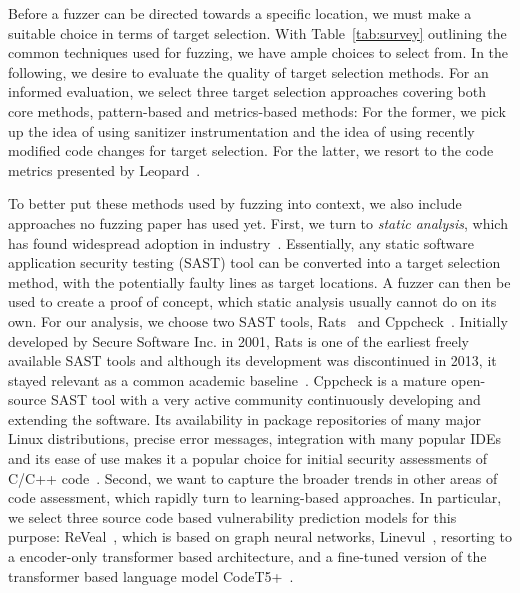 Before a fuzzer can be directed towards a specific location, we must make a suitable choice in terms of target selection. With Table~\ref{tab:survey} outlining the common techniques used for fuzzing, we have ample choices to select from. In the following, we desire to evaluate the quality of target selection methods. For an informed evaluation, we select three target selection approaches covering both core methods, pattern-based and metrics-based methods: For the former, we pick up the idea of using sanitizer instrumentation \cite{OstRazBosGiu+20, CheLiXuGuo+20, ZheZhaHuaRen+23} and the idea of using recently modified code changes \cite{ZhuBöh21} for target selection. For the latter, we resort to the code metrics presented by Leopard~\cite{DuCheLiGuo+19}.

To better put these methods used by fuzzing into context, we also include approaches no fuzzing paper has used yet.
First, we turn to \emph{static analysis}, which has found widespread adoption in industry~\cite{FacebookInfer, GoogleSAST, GithubSAST}.
Essentially, any static software application security testing (SAST) tool can be converted into a target selection method, with the potentially faulty lines as target locations. A fuzzer can then be used to create a proof of concept, which static analysis usually cannot do on its own. 
For our analysis, we choose two SAST tools, Rats~\cite{rats} and Cppcheck~\cite{cppcheck}. 
Initially developed by Secure Software Inc. in 2001, Rats is one of the earliest freely available SAST tools and although its development was discontinued in 2013, it stayed relevant as a  common academic baseline~\cite{SASTeval2018, KAUR20202023, 10.1145/3475716.3475781}.
Cppcheck is a mature open-source SAST tool with a very active community continuously developing and extending the software. 
Its availability in package repositories of many major Linux distributions, precise error messages, integration with many popular IDEs and its ease of use makes it a popular choice for initial security assessments of C/C++ code~\cite{cppcheck, 8531281}.
Second, we want to capture the broader trends in other areas of code assessment, which rapidly turn to learning-based approaches. In particular, we select three source code based vulnerability prediction models for this purpose: ReVeal~\cite{ChaKriDinRay+21}, which is based on graph neural networks, Linevul~\cite{FuTan+22}, resorting to a encoder-only transformer based architecture, and a fine-tuned version of the transformer based language model CodeT5+~\cite{wang2023codet5plus}.

